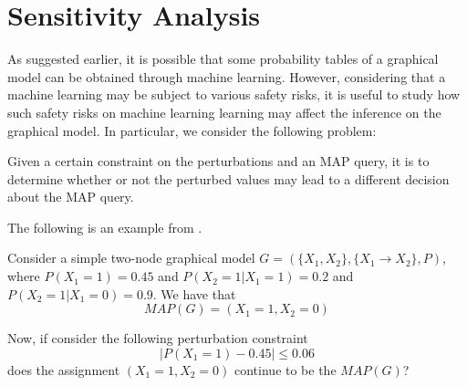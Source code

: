 \newpage
\chapter{Sensitivity Analysis}

As suggested earlier, it is possible that some probability tables of a graphical model can be obtained through machine learning. However, considering that a machine learning may be subject to various safety risks, it is useful to study how such safety risks on machine learning learning may affect the inference on the graphical model. In particular, we consider the following problem: 

\begin{tcolorbox}
 Given a certain constraint on the perturbations and an MAP query, it is to determine whether or not the perturbed values may lead to a different decision about the MAP query.
\end{tcolorbox}

The following is an example from \cite{NIPS2014_09662890}. 

\begin{example}
Consider a simple two-node graphical model $G=(\{X_1,X_2\}, \{X_1 \rightarrow X_2\}, P)$, where $P(X_1=1)=0.45$ and $P(X_2=1|X_1=1)=0.2$ and $P(X_2=1|X_1=0)=0.9$. We have that 
\begin{equation}
MAP(G) = (X_1=1, X_2=0)
\end{equation}

Now, if consider the following perturbation constraint
\begin{equation}
    |P(X_1=1)-0.45| \leq 0.06
\end{equation}
does the assignment $(X_1=1, X_2=0)$ continue to be the $MAP(G)$? 
\end{example}


